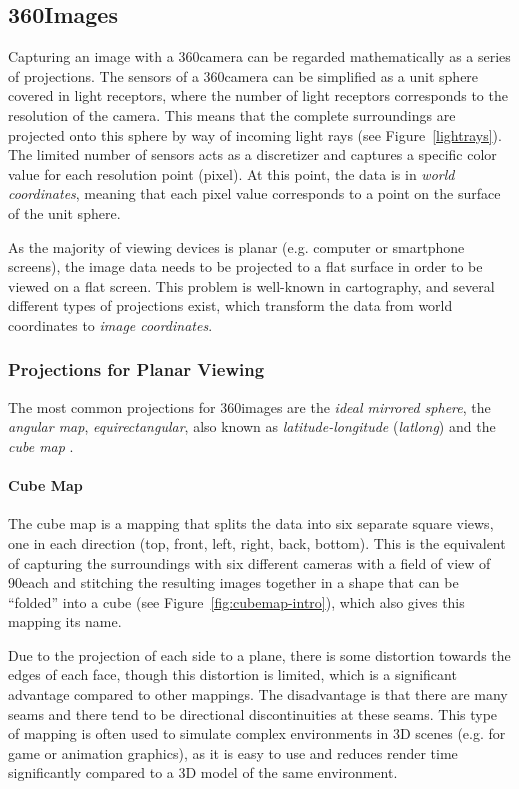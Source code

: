 \subsection{360\degree Images}
Capturing an image with a 360\degree camera can be regarded mathematically as a series of projections. The sensors of a 360\degree camera can be simplified as a unit sphere covered in light receptors, where the number of light receptors corresponds to the resolution of the camera. This means that the complete surroundings are projected onto this sphere by way of incoming light rays (see Figure~\ref{lightrays}). The limited number of sensors acts as a discretizer and captures a specific color value for each resolution point (pixel). At this point, the data is in \emph{world coordinates}, meaning that each pixel value corresponds to a point on the surface of the unit sphere. 

As the majority of viewing devices is planar (e.g. computer or smartphone screens), the image data needs to be projected to a flat surface in order to be viewed on a flat screen. This problem is well-known in cartography, and several different types of projections exist, which transform the data from world coordinates to \emph{image coordinates}.

\subsubsection{Projections for Planar Viewing \label{projections} \cite{hdrbook}}
The most common projections for 360\degree images are the \emph{ideal mirrored sphere}, the \emph{angular map},  \emph{equirectangular}, also known as \emph{latitude-longitude} (\emph{latlong}) and the \emph{cube map} \cite{hdrbook}.

\paragraph{Cube Map}
The cube map is a mapping that splits the data into six separate square views, one in each direction (top, front, left, right, back, bottom). This is the equivalent of capturing the surroundings with six different cameras with a field of view of 90\degree each and stitching the resulting images together in a shape that can be ``folded'' into a cube (see Figure~\ref{fig:cubemap-intro}), which also gives this mapping its name.

Due to the projection of each side to a plane, there is some distortion towards the edges of each face, though this distortion is limited, which is a significant advantage compared to other mappings. The disadvantage is that there are many seams and there tend to be directional discontinuities at these seams. This type of mapping is often used to simulate complex environments in 3D scenes (e.g. for game or animation graphics), as it is easy to use and reduces render time significantly compared to a 3D model of the same environment.
\cite{hdrbook}

